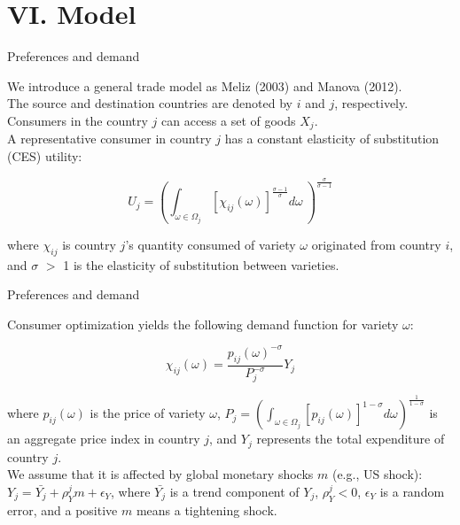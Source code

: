 \documentclass[10pt]{beamer}
\begin{document}
\section{VI. Model}

\begin{frame}{Preferences and demand}

We introduce a general trade model as Meliz (2003) and Manova (2012). \\

The source and destination countries are denoted by $i$ and $j$, respectively. Consumers in the country $j$ can access a set of goods $X_j$. \\
\medskip
A representative consumer in country $j$ has a constant elasticity of substitution (CES) utility:

\begin{equation}
U_j=(\int_{\omega \in \Omega_j} [\chi_{ij}(\omega)]^{\frac{\sigma-1}{\sigma}} d\omega\ )^\frac{\sigma}{\sigma-1}
\end{equation}

where $\chi_{ij}$ is country $j$’s quantity consumed of variety $\omega$ originated from country $i$, and $\sigma$ $>$ 1 is the elasticity of substitution between varieties. 

\end{frame}



\begin{frame}{Preferences and demand}

Consumer optimization yields the following demand function for variety $\omega$:

\begin{equation}
\chi_{ij}(\omega)=\frac{p_{ij}(\omega)^{-\sigma}}{P_j^{-\sigma}} Y_j
\end{equation}


where $p_{ij}(\omega)$ is the price of variety $\omega$, $P_j=(\int_{\omega \in \Omega_j} [p_{ij}(\omega)]^{1-\sigma} d \omega)^{\frac{1}{1-\sigma}}$ is an aggregate price index in country $j$, and $Y_j$ represents the total expenditure of country $j$. \\

We assume that it is affected by global monetary shocks $m$ (e.g., US shock): $Y_j=\bar{Y_j}+\rho_{Y}^j m+\epsilon_Y$, where $\bar{Y_j}$ is a trend component of $Y_j$, $\rho_{Y}^j<0$, $\epsilon_Y$ is a random error, and a positive $m$ means a tightening shock.

\end{frame}
\end{document}
